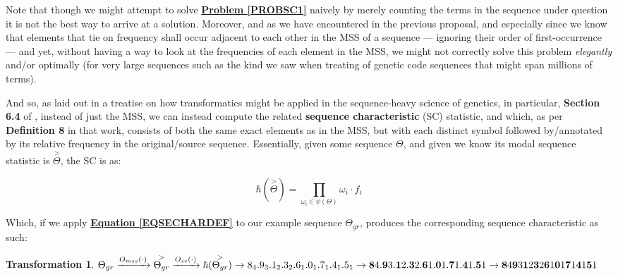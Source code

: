 \documentclass[12pt,a4paper]{article}
\newtheorem{trans}{Transformation}
\begin{document}
Note that though we might attempt to solve \textbf{\hyperref[PROBSC1]{Problem \ref{PROBSC1}}} naively by merely counting the terms in the sequence under question it is not the best way to arrive at a solution. Moreover, and as we have encountered in the previous proposal, and especially since we know that elements that tie on frequency shall occur adjacent to each other in the MSS of a sequence --- ignoring their order of first-occurrence --- and yet, without having a way to look at the frequencies of each element in the MSS, we might not correctly solve this problem \textit{elegantly} and/or optimally (for very large sequences such as the kind we saw when treating of genetic code sequences\cite{lutalo_2025_trans_genetics} that might span millions of terms). 

And so, as laid out in a treatise on how transformatics might be applied in the sequence-heavy science of genetics\cite{lutalo_2025_trans_genetics}, in particular, \textbf{Section 6.4} of \cite{lutalo_2025_trans_genetics}, instead of just the MSS, we can instead compute the related \textbf{sequence characteristic} (SC) statistic, and which, as per \textbf{Definition 8} in that work, consists of both the same exact elements as in the MSS, but with each distinct symbol followed by/annotated by its relative frequency in the original/source sequence. Essentially, given some sequence $\Theta$, and given we know its modal sequence statistic is $\overset{>}{\Theta}$, the SC is as:


\begin{equation}
\label{EQSECHARDEF}
 \hbar(\overset{>}{\Theta}) = \prod\limits_{\omega_i \in \psi(\Theta)} \omega_i\cdot f_i
\end{equation}

Which, if we apply \textbf{\hyperref[EQSECHARDEF]{Equation \ref{EQSECHARDEF}}} to our example sequence $\Theta_{gr}$, produces the corresponding sequence characteristic as such:\\


\begin{trans}
\label{TRANSSCGR}
$ \Theta_{gr} \xrightarrow{O_{mss}(\cdot)} \overset{>}{\Theta_{gr}}  \xrightarrow{O_{sc}(\cdot)} \hbar(\overset{>}{\Theta_{gr}}) \rightarrow 8_4.9_3.1_2.3_2.6_1.0_1.7_1.4_1.5_1 \\
 \rightarrow \textbf{8}4.\textbf{9}3.\textbf{1}2.\textbf{3}2.\textbf{6}1.\textbf{0}1.\textbf{7}1.\textbf{4}1.\textbf{5}1 \rightarrow \textbf{8}4\textbf{9}3\textbf{1}2\textbf{3}2\textbf{6}1\textbf{0}1\textbf{7}1\textbf{4}1\textbf{5}1$\\
\end{trans}
\end{document}
